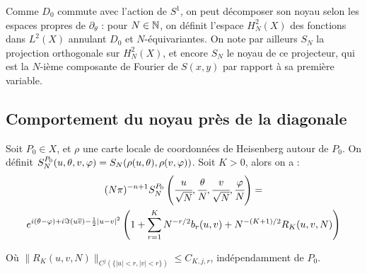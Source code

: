 Comme $D_0$ commute avec l'action de $S^1$, on peut décomposer son noyau selon les espaces propres de $\partial_{\theta}$ : pour $N \in \mathbb{N}$, on définit l'espace $H^2_N(X)$ des fonctions dans $L^2(X)$ annulant $D_0$ et $N$-équivariantes. On note par ailleurs  $S_N$ la projection orthogonale sur $H^2_N(X)$, et encore $S_N$ le noyau de ce projecteur, qui est la $N$-ième composante de Fourier de $S(x,y)$ par rapport à sa première variable.

\subsection{Comportement du noyau près de la diagonale}

\begin{theorem}
	Soit $P_0 \in X$, et $\rho$ une carte locale de coordonnées de Heisenberg autour de $P_0$. On définit $S_N^{P_0}(u,\theta,v,\varphi) = S_N(\rho(u,\theta), \rho(v,\varphi))$. Soit $K>0$, alors on a :
	\begin{multline*}
	(N\pi)^{-n+1}S_N^{P_0}\left(\cfrac{u}{\sqrt{N}},\cfrac{\theta}{N}, \cfrac{v}{\sqrt{N}}, \cfrac{\varphi}{N}\right) = \\e^{i(\theta-\varphi) + i \Im(u\overline{v}) - \frac12 |u-v|^2}\left(1+\sum_{r=1}^K N^{-r/2}b_r(u,v) + N^{-(K+1)/2}R_K(u,v,N)\right)
	\end{multline*}
	
	Où $\|R_K(u,v,N)\|_{C^j(\{|u| < r, |v| < r\})} \leq C_{K,j,r}$, indépendamment de $P_0$.
\end{theorem}

